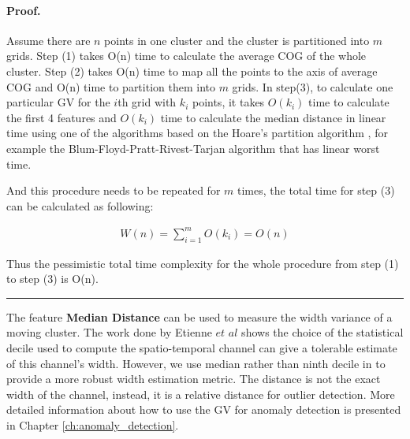 \documentclass[12pt,glossary]{dalcsthesis}
\newenvironment{proof}{\paragraph{Proof.}}
{\nopagebreak\hfill\nopagebreak\rule{2mm}{2mm}\par\bigskip}
\begin{document}
\begin{proof}
Assume there are $n$ points in one cluster and the cluster is partitioned into $m$ grids. Step (1) takes O(n) time to calculate the average COG of the whole cluster. Step (2) takes O(n) time to map all the points to the axis of average COG and O(n) time to partition them into $m$ grids. In step(3), to calculate one particular GV for the $i$th grid with $k_i$ points, it takes $O(k_i)$ time to calculate the first 4 features and 
$O(k_i)$
time to calculate the median distance 
%
in linear time using one of the algorithms based on the Hoare's partition algorithm \cite{hoare:partition-cacm62}, for example the Blum-Floyd-Pratt-Rivest-Tarjan algorithm \cite{blum:linearSelection-jcss73} that has linear worst time.
 
And this procedure needs to be repeated for $m$ times, the total time for step (3) can be calculated as following:

\begin{eqnarray*}
W(n) = \sum_{i=1}^m O(k_i) = O(n)
\end{eqnarray*} 

 
Thus the pessimistic total time complexity for the whole procedure from step (1) to step (3) is 
O(n).

\end{proof}

The feature \textbf{Median Distance} can be used to measure the width variance of a moving cluster. The work done by Etienne $et$ $al$ \cite{Etienne12} shows the choice of the statistical decile used to compute the spatio-temporal channel can give a tolerable estimate of this channel's width. However, we use median rather than ninth decile in \cite{Etienne12} to provide a more robust width estimation metric. The distance is not the exact width of the channel, instead, it is a relative distance for outlier detection. More detailed information about how to use the GV for anomaly detection is presented in Chapter \ref{ch:anomaly_detection}.
\end{document}
